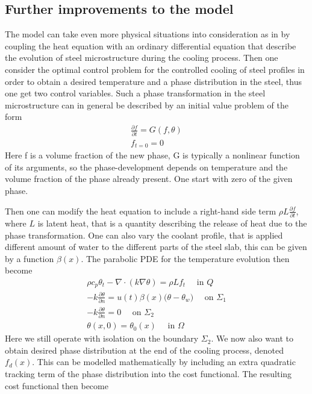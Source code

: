 
\subsection{Further improvements to the model}
The model can take even more physical situations into consideration as in \cite{DPSteelOverview} by coupling the  heat equation with an ordinary differential equation that describe the evolution of steel microstructure during the cooling process. Then one consider the optimal control problem for the controlled cooling of steel profiles in order to obtain a desired temperature and a phase distribution in the steel, thus one get two control variables. Such a phase transformation in the steel microstructure can in general be described by an initial value problem of the form 
\begin{align*}
    \frac{\partial f}{\partial t} = G(f,\theta ) \\
    f_{t=0} = 0
\end{align*}
Here f is a volume fraction of the new phase, G is typically a nonlinear function of its arguments, so the phase-development depends on temperature and the volume fraction of the phase already present. One start with zero of the given phase. 

Then one can modify the heat equation to include a right-hand side term $\rho L \frac{\partial f}{\partial t}$, where $L$ is latent heat, that is a quantity describing the release of heat due to the phase transformation. One can also vary the coolant profile, that is applied different amount of water to the different parts of the steel slab, this can be given by a function $\beta (x)$. The parabolic PDE for the temperature evolution then become 
\begin{align*}
    \rho c_p \theta_t - \nabla \cdot (k\nabla \theta) = \rho L f_t \quad \textrm{ in } Q \\
    - k \frac{\partial \theta}{\partial n} = u(t)\beta(x) \bigg (\theta - \theta_w \bigg ) \quad \textrm{ on } \Sigma_1 \\
    -k \frac{\partial \theta}{\partial n} = 0 \quad \textrm{ on } \Sigma_2 \\
    \theta(x,0) = \theta_0(x) \quad \textrm{ in } \Omega
\end{align*}
Here we still operate with isolation on the boundary $\Sigma_2$. We now also want to obtain desired phase distribution at the end of the cooling process, denoted $f_d(x)$. This can be modelled mathematically by including an extra quadratic tracking term of the phase distribution into the cost functional. The resulting cost functional then become

